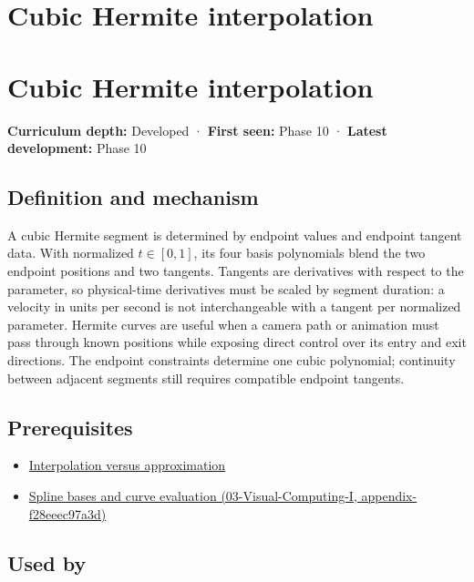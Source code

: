 \hypertarget{appendix-db3aef8f2fd6}{}
\section*{Cubic Hermite interpolation}
\section{Cubic Hermite interpolation}\label{appendix-db3aef8f2fd6-cubic-hermite-interpolation}

\textbf{Curriculum depth:} Developed · \textbf{First seen:} Phase 10 · \textbf{Latest development:} Phase 10

\subsection{Definition and mechanism}\label{appendix-db3aef8f2fd6-definition-and-mechanism}

A cubic Hermite segment is determined by endpoint values and endpoint tangent data. With normalized \(t\in[0,1]\), its four basis polynomials blend the two endpoint positions and two tangents. Tangents are derivatives with respect to the parameter, so physical-time derivatives must be scaled by segment duration: a velocity in units per second is not interchangeable with a tangent per normalized parameter. Hermite curves are useful when a camera path or animation must pass through known positions while exposing direct control over its entry and exit directions. The endpoint constraints determine one cubic polynomial; continuity between adjacent segments still requires compatible endpoint tangents.

\subsection{Prerequisites}\label{appendix-db3aef8f2fd6-prerequisites}

\begin{itemize}
\tightlist
\item
  \hyperref[appendix-0c2a5f69851e]{Interpolation versus approximation}
\item
  \href{../03-Visual-Computing-I/main.pdf\#nameddest=appendix-f28eeec97a3d}{Spline bases and curve evaluation (03-Visual-Computing-I, appendix-f28eeec97a3d)}
\end{itemize}

\subsection{Used by}\label{appendix-db3aef8f2fd6-used-by}

